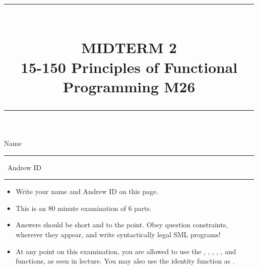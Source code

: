 \documentclass[addpoints,12pt, answers]{exam}
\newcommand{\HRule}[1]{\rule{\linewidth}{#1}}
\begin{document}
\pagestyle{headandfoot}
\footer{}{\thepage}{}


\setlength{\droptitle}{-8em}   %

\title{ \normalsize \textsc{}
		\HRule{1.5pt} \\
		\large \textbf{
      \uppercase{Midterm 2} \\
      15-150 Principles of Functional Programming M26} \\
    \HRule{1.5pt}
}
\date{}

\maketitle

\vspace{-3cm}

\hspace{-1cm} Name \rule{6cm}{0.4pt} \, Andrew ID \rule{6cm}{0.4pt}

\vspace{5pt}

\begin{itemize}
  \item Write your name and Andrew ID on this page.
  \item This is an 80 minute examination of 6 parts.
  \item Answers should be short and to the point. Obey question constraints, wherever
  they appear, and write syntactically legal SML programs!
  \item At any point on this examination, you are allowed to use the ,
  , , , , and \code{|>} functions,
  as seen in lecture. You may also use the identity function as .
\end{itemize}
\vspace{\fill}

{\small
\vqword{}
\begin{center}
\gradetable[v][questions]
\end{center}
}

\vspace{\fill}
\end{document}
